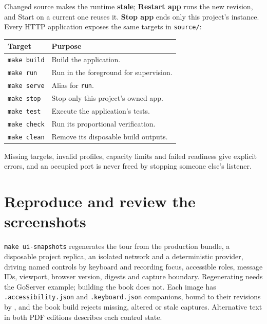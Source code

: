 Changed source makes the runtime \textbf{stale}; \textbf{Restart app} runs the new
revision, and Start on a current one reuses it. \textbf{Stop app} ends only this
project's instance. Every HTTP application exposes the same targets in
\texttt{source/}:
\begin{center}
\begin{tabular}{ll}
\toprule
Target & Purpose \\
\midrule
\texttt{make build} & Build the application. \\
\texttt{make run} & Run in the foreground for supervision. \\
\texttt{make serve} & Alias for \texttt{run}. \\
\texttt{make stop} & Stop only this project's owned app. \\
\texttt{make test} & Execute the application's tests. \\
\texttt{make check} & Run its proportional verification. \\
\texttt{make clean} & Remove its disposable build outputs. \\
\bottomrule
\end{tabular}
\end{center}
Missing targets, invalid profiles, capacity limits and failed readiness give
explicit errors, and an occupied port is never freed by stopping someone else's
listener.

\section{Reproduce and review the screenshots}

\texttt{make ui-snapshots} regenerates the tour from the production bundle, a
disposable project replica, an isolated network and a deterministic provider,
driving named controls by keyboard and recording focus, accessible roles, message
IDs, viewport, browser version, digests and capture boundary. Regenerating needs
the GoServer example; building the book does not. Each image has
\texttt{.accessibility.json} and \texttt{.keyboard.json} companions, bound to
their revisions by , and the book build
rejects missing, altered or stale captures. Alternative text in both PDF editions
describes each control state.
